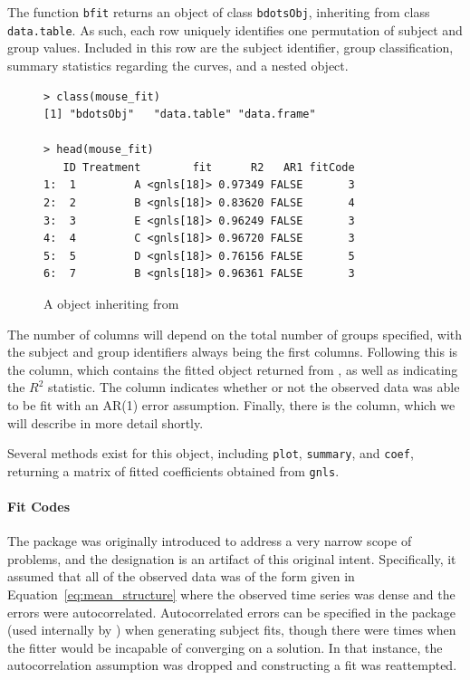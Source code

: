 The function \texttt{bfit} returns an object of class \texttt{bdotsObj}, inheriting from class \texttt{data.table}. As such, each row uniquely identifies one permutation of subject and group values. Included in this row are the subject identifier, group classification, summary statistics regarding the curves, and a nested  object. 

\begin{singlespace}
\begin{figure}[H]
\centering
\begin{BVerbatim}
> class(mouse_fit)
[1] "bdotsObj"   "data.table" "data.frame"

> head(mouse_fit)
   ID Treatment        fit      R2   AR1 fitCode
1:  1         A <gnls[18]> 0.97349 FALSE       3
2:  2         B <gnls[18]> 0.83620 FALSE       4
3:  3         E <gnls[18]> 0.96249 FALSE       3
4:  4         C <gnls[18]> 0.96720 FALSE       3
5:  5         D <gnls[18]> 0.76156 FALSE       5
6:  7         B <gnls[18]> 0.96361 FALSE       3
\end{BVerbatim}
\caption{A  object inheriting from }
\label{fig:bdotsObj}
\end{figure}
\end{singlespace}

The number of columns will depend on the total number of groups specified, with the subject and group identifiers always being the first columns. Following this is the  column, which contains the fitted object returned from , as well as  indicating the $R^2$ statistic. The  column indicates whether or not the observed data was able to be fit with an AR(1) error assumption. Finally, there is the  column, which we will describe in more detail shortly.

Several methods exist for this object, including \texttt{plot}, \texttt{summary}, and \texttt{coef}, returning a matrix of fitted coefficients obtained from \texttt{gnls}. 


\paragraph{Fit Codes}\label{sec:fitcode}

The  package was originally introduced to address a very narrow scope of problems, and the  designation is an artifact of this original intent. Specifically, it assumed that all of the observed data was of the form given in Equation~\ref{eq:mean_structure} where the observed time series was dense and the errors were autocorrelated. Autocorrelated errors can be specified in the  package (used internally by ) when generating subject fits, though there were times when the fitter would be incapable of converging on  a solution. In that instance, the autocorrelation assumption was dropped and constructing a fit was reattempted.

